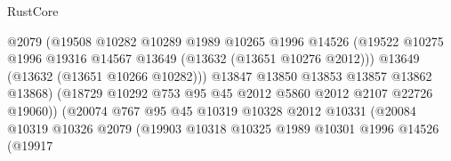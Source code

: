 \begin{lexlean}{RustCore}
\begin{coremodule}
                                        @2079
                                        (@19508
                                          @10282
                                          @10289
                                          @1989
                                          @10265
                                          @1996
                                          @14526
                                          (@19522
                                            @10275
                                            @1996
                                            @19316
                                            @14567
                                            @13649
                                            (@13632 (@13651 @10276 @2012)))
                                          @13649
                                          (@13632 (@13651 @10266 @10282)))
                                        @13847
                                        @13850
                                        @13853
                                        @13857
                                        @13862
                                        @13868)
                                      (@18729
                                        @10292
                                        @753
                                        @95
                                        @45
                                        @2012
                                        @5860
                                        @2012
                                        @2107
                                        @22726
                                        @19060))
                                    (@20074
                                      @767
                                      @95
                                      @45
                                      @10319
                                      @10328
                                      @2012
                                      @10331
                                      (@20084
                                        @10319
                                        @10326
                                        @2079
                                        (@19903
                                          @10318
                                          @10325
                                          @1989
                                          @10301
                                          @1996
                                          @14526
                                          (@19917

\end{coremodule}
\end{lexlean}
